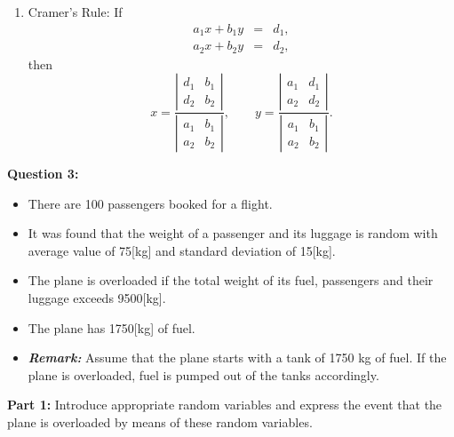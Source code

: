 \begin{enumerate}
\begin{enumerate}
		\item Cramer's Rule: If
		\begin{eqnarray*}
			a_{1}x+b_{1}y &=&d_{1}, \\
			a_{2}x+b_{2}y &=&d_{2},
		\end{eqnarray*}%
		then%
		\begin{equation*}
		x=\frac{\left\vert
			\begin{array}{cc}
			d_{1} & b_{1} \\
			d_{2} & b_{2}%
			\end{array}%
			\right\vert }{\left\vert
			\begin{array}{cc}
			a_{1} & b_{1} \\
			a_{2} & b_{2}%
			\end{array}%
			\right\vert },\qquad y=\frac{\left\vert
			\begin{array}{cc}
			a_{1} & d_{1} \\
			a_{2} & d_{2}%
			\end{array}%
			\right\vert }{\left\vert
			\begin{array}{cc}
			a_{1} & b_{1} \\
			a_{2} & b_{2}%
			\end{array}%
			\right\vert }.
		\end{equation*}
	\end{enumerate}
\end{enumerate}




\noindent\textbf{Question 3:}\\
\begin{itemize} \item There are 100 passengers booked for a
	flight. \item It was found that the weight of a
	passenger and its luggage is random with average value of 75[kg] and standard deviation of 15[kg].
	\item The plane is overloaded if the total weight of its fuel, passengers and their luggage exceeds 9500[kg].
	\item The plane has 1750[kg] of fuel.
	\item \textbf{\emph{Remark:}} Assume that the plane starts with a tank of 1750 kg of fuel. If the plane is overloaded, fuel is pumped out of the tanks accordingly.
\end{itemize}\bigskip

\noindent\textbf{Part 1:} Introduce appropriate random variables and express the event that the plane is overloaded by means of these random variables.

